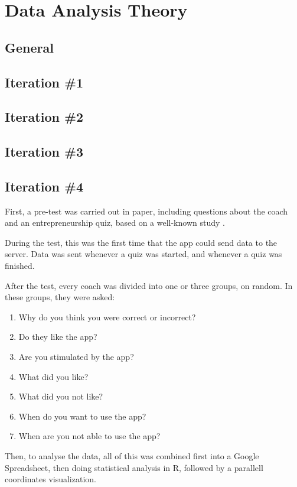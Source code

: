 \section{Data Analysis Theory}

\subsection{General}


\subsection{Iteration \#1}

\subsection{Iteration \#2}

\subsection{Iteration \#3}

\subsection{Iteration \#4}

First, a pre-test was carried out in paper, including questions about the coach and an entrepreneurship quiz, based on a well-known study \cite{general-entrepreneurship-quiz}.

During the test, this was the first time that the app could send data to the server. Data was sent whenever a quiz was started, and whenever a quiz was finished.

After the test, every coach was divided into one or three groups, on random. In these groups, they were asked:

\begin{enumerate}
\item Why do you think you were correct or incorrect?
\item Do they like the app?
\item Are you stimulated by the app?
\item What did you like?
\item What did you not like?
\item When do you want to use the app?
\item When are you not able to use the app?
\end{enumerate}

Then, to analyse the data, all of this was combined first into a Google Spreadsheet, then doing statistical analysis in R, followed by a parallell coordinates visualization.



